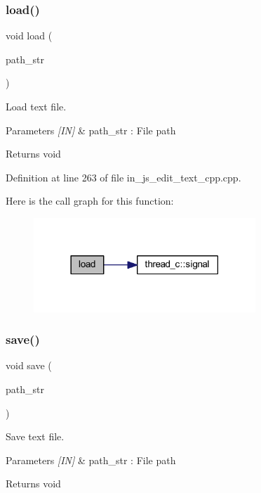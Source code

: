 \subsubsection{load()}
{\footnotesize\ttfamily void load (\begin{DoxyParamCaption}\item[{wx\+String}]{path\+\_\+str }\end{DoxyParamCaption})}



Load text file. 


\begin{DoxyParams}{Parameters}
{\em \mbox{[}\+I\+N\mbox{]}} & path\+\_\+str \+: File path \\
\hline
\end{DoxyParams}
\begin{DoxyReturn}{Returns}
void 
\end{DoxyReturn}


Definition at line 263 of file in\+\_\+js\+\_\+edit\+\_\+text\+\_\+cpp.\+cpp.

Here is the call graph for this function\+:
\nopagebreak
\begin{figure}[H]
\begin{center}
\leavevmode
\includegraphics[width=237pt]{group___edit__text_ga8caf41718ffb5bf060de703f18f72546_cgraph}
\end{center}
\end{figure}
\mbox{\label{group___edit__text_gabf07e1a2024a4600e34a062879c73bed}} 
\subsubsection{save()}
{\footnotesize\ttfamily void save (\begin{DoxyParamCaption}\item[{wx\+String}]{path\+\_\+str }\end{DoxyParamCaption})}



Save text file. 


\begin{DoxyParams}{Parameters}
{\em \mbox{[}\+I\+N\mbox{]}} & path\+\_\+str \+: File path \\
\hline
\end{DoxyParams}
\begin{DoxyReturn}{Returns}
void 
\end{DoxyReturn}



